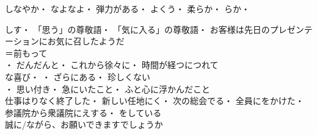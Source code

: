 しなやか・
なよなよ・
弾力がある・
よくう・
柔らか・
らか・

しす・
「思う」の尊敬語・
「気に入る」の尊敬語・
お客様は先日のプレゼンテーションにお気に召したようだ\\

＝前もって\\
・
だんだんと・
これから徐々に・
時間が経つにつれて\\

な喜び・
・
ざらにある・
珍しくない\\
・
思い付き・
急にいたこと・
ふと心に浮かんだこと\\

仕事はりなく終了した・
新しい任地にく・
次の総会でる・
全員にをかけた・
参議院から衆議院にえする・
をしている\\

誠に/ながら、お願いできますでしょうか\\
